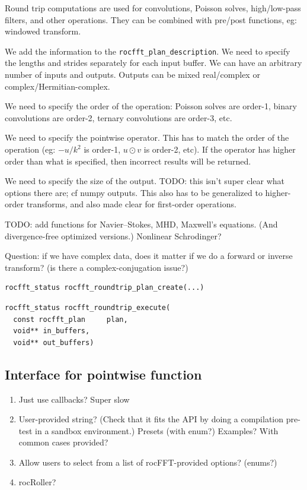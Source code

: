 \documentclass[12pt]{article}
\renewcommand{\(}{\left(}
\renewcommand{\)}{\right)}
\begin{document}
Round trip computations are used for convolutions, Poisson solves,
high/low-pass filters, and other operations.  They can be combined
with pre/post functions, eg: windowed transform.

We add the information to the \texttt{rocfft_plan_description}.  We
need to specify the lengths and strides separately for each input
buffer.  We can have an arbitrary number of inputs and outputs.  Outputs
can be mixed real/complex or complex/Hermitian-complex.

We need to specify the order of the operation: Poisson solves are
order-1, binary convolutions are order-2, ternary convolutions are
order-3, etc.

We need to specify the pointwise operator.  This has to match the
order of the operation (eg: $-u/k^2$ is order-1, $u\odot v$ is
order-2, etc).  If the operator has higher order than what is
specified, then incorrect results will be returned.

We need to specify the size of the output.  TODO: this isn't super
clear what options there are; cf numpy outputs.  This also has to be
generalized to higher-order transforms, and also made clear for
first-order operations.

TODO: add functions for Navier--Stokes, MHD, Maxwell's equations.
(And divergence-free optimized versions.)  Nonlinear Schrodinger?

Question: if we have complex data, does it matter if we do a forward
or inverse transform?  (is there a complex-conjugation issue?)


\begin{lstlisting}
rocfft_status rocfft_roundtrip_plan_create(...)
\end{lstlisting}

\begin{lstlisting}
rocfft_status rocfft_roundtrip_execute(
  const rocfft_plan     plan,
  void** in_buffers,
  void** out_buffers)
\end{lstlisting}


\subsection{Interface for pointwise function}

\begin{enumerate}
\item Just use callbacks?  Super slow
\item User-provided string?  (Check that it fits the API by doing a
  compilation pre-test in a sandbox environment.)
  \subitem Presets (with enum?)
  \subitem Examples?  With common cases provided?
\item Allow users to select from a list of rocFFT-provided options?
  (enums?)
\item rocRoller?
\end{enumerate}
\end{document}
